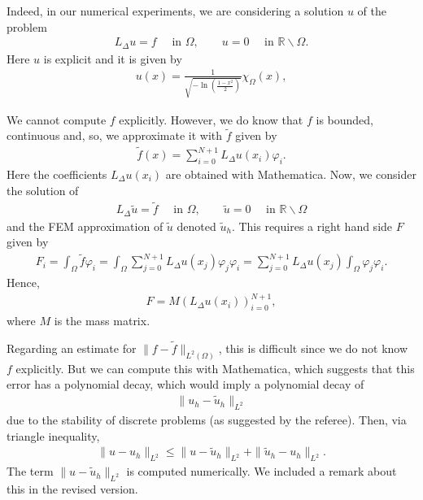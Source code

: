 \documentclass[11 pt]{article}
\numberwithin{equation}{section}
\def\r{\mathbb{R}}
\def\tilde{\widetilde}
\begin{document}
\begin{enumerate}
\begin{itemize}
Indeed, in our numerical experiments, we are considering a solution $u$ of the problem
        \begin{align*}
         L_\Delta u = f\quad \text{ in }\Omega,\qquad u=0\quad \text{ in }\r\backslash \Omega.
        \end{align*}
        Here $u$ is explicit and it is given by
        \begin{align}\label{udef}
 u(x)=\frac{1}{\sqrt{-\ln\left(\frac{1-x^2}{2}\right)}} \chi_{\Omega}(x),
\end{align}

We cannot compute $f$ explicitly.  However, we do know that $f$ is bounded, continuous and, so, we approximate it with $\widetilde f$ given by
\begin{align*}
 \widetilde f (x) = \sum_{i=0}^{N+1} L_\Delta u(x_i)\varphi_i.
 \end{align*}
Here the coefficients $L_\Delta u(x_i)$ are obtained with Mathematica. Now, we consider the solution of
\begin{align*}
         L_\Delta \widetilde u = \widetilde f\quad \text{ in }\Omega,\qquad \widetilde u=0\quad \text{ in }\r\backslash \Omega
        \end{align*}
and the FEM approximation of $\widetilde u$ denoted $\widetilde u_h$. This requires a right hand side $F$ given by
\begin{align*}
 F_i
 =\int_{\Omega} \widetilde f \varphi_i
 = \int_{\Omega} \sum_{j=0}^{N+1} L_\Delta u(x_j)\varphi_j \varphi_i
 =\sum_{j=0}^{N+1} L_\Delta u(x_j) \int_{\Omega} \varphi_j \varphi_i.
 \end{align*}
Hence,
\begin{align*}
 F = M  (L_\Delta u(x_i))_{i=0}^{N+1},
\end{align*}
where $M$ is the mass matrix.

Regarding an estimate for \(\|f-\tilde{f}\|_{L^{2}(\Omega)}\), this is difficult since we do not know $f$ explicitly. But we can compute this with Mathematica, which suggests that this error has a polynomial decay, which would imply a polynomial decay of
\begin{align*}
\|u_{h}-\widetilde u_{h}\|_{L^2}
\end{align*}
due to the stability of discrete problems (as suggested by the referee).  Then, via triangle inequality,
\begin{align*}
 \|u-u_h\|_{L^2}
 \leq \|u-\widetilde u_h\|_{L^2}+\|\widetilde u_h-u_h\|_{L^2}.
\end{align*}
The term $\|u-\widetilde u_h\|_{L^2}$ is computed numerically.  We included a remark about this in the revised version.


\end{itemize}
\end{enumerate}
\end{document}
